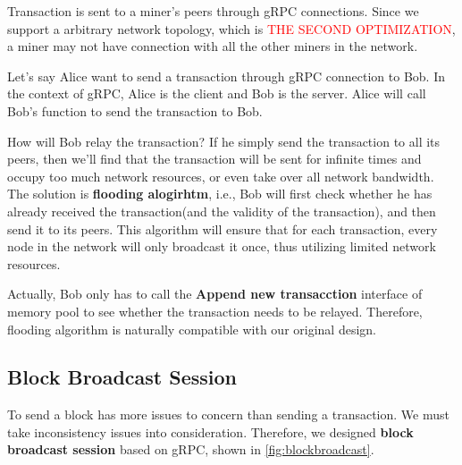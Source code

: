 \documentclass{article}
\begin{document}
\begin{spacing}{1.1}
Transaction is sent to a miner's peers through gRPC connections. Since we support a arbitrary network topology, which is \textcolor{red}{THE SECOND OPTIMIZATION}, a miner may not have connection with all the other miners in the network.

Let's say Alice want to send a transaction through gRPC connection to Bob. In the context of gRPC, Alice is the client and Bob is the server. Alice will call Bob's function to send the transaction to Bob.

How will Bob relay the transaction? If he simply send the transaction to all its peers, then we'll find that the transaction will be sent for infinite times and occupy too much network resources, or even take over all network bandwidth. The solution is \textbf{flooding alogirhtm}, i.e., Bob will first check whether he has already received the transaction(and the validity of the transaction), and then send it to its peers. This algorithm will ensure that for each transaction, every node in the network will only broadcast it once, thus utilizing limited network resources.

Actually, Bob only has to call the \textbf{Append new transacction} interface of memory pool to see whether the transaction needs to be relayed. Therefore, flooding algorithm is naturally compatible with our original design.

\subsection{Block Broadcast Session}


To send a block has more issues to concern than sending a transaction. We must take inconsistency issues into consideration. Therefore, we designed \textbf{block broadcast session} based on gRPC, shown in \cref{fig:blockbroadcast}.


\end{spacing}
\end{document}
